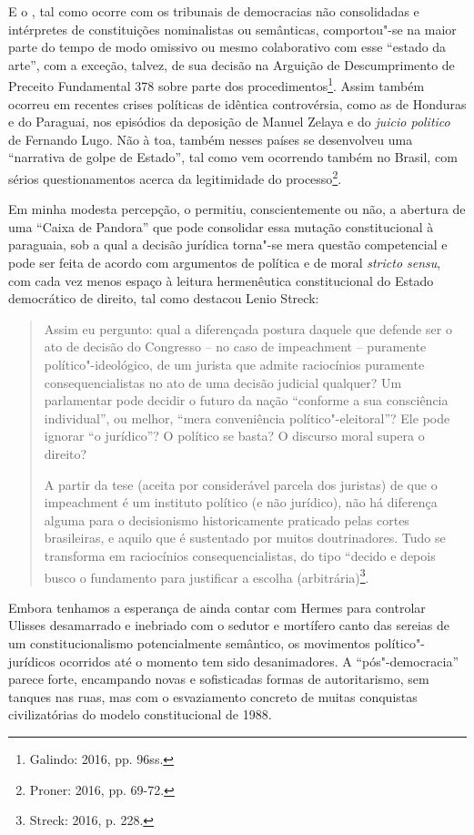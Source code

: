 E o , tal como ocorre com os tribunais de democracias não
consolidadas e intérpretes de constituições nominalistas ou semânticas,
comportou"-se na maior parte do tempo de modo omissivo ou mesmo
colaborativo com esse ``estado da arte'', com a exceção, talvez, de sua
decisão na Arguição de Descumprimento de Preceito Fundamental 378 sobre
parte dos procedimentos\footnote{Galindo: 2016, pp. 96ss.}. Assim também ocorreu
em recentes crises políticas de idêntica controvérsia, como as de
Honduras e do Paraguai, nos episódios da deposição de Manuel Zelaya e do
\emph{juicio politico} de Fernando Lugo. Não à toa, também nesses países
se desenvolveu uma ``narrativa de golpe de Estado'', tal como vem
ocorrendo também no Brasil, com sérios questionamentos acerca da
legitimidade do processo\footnote{Proner: 2016, pp. 69-72.}.

Em minha modesta percepção, o  permitiu, conscientemente ou não, a
abertura de uma ``Caixa de Pandora'' que pode consolidar essa mutação
constitucional à paraguaia, sob a qual a decisão jurídica torna"-se mera
questão competencial e pode ser feita de acordo com argumentos de
política e de moral \emph{stricto sensu}, com cada vez menos espaço à
leitura hermenêutica constitucional do Estado democrático de direito,
tal como destacou Lenio Streck:

\begin{quote}
Assim eu pergunto: qual a diferençada postura daquele que defende ser o
ato de decisão do Congresso -- no caso de impeachment --
puramente político"-ideológico, de um jurista que admite raciocínios
puramente consequencialistas no ato de uma decisão judicial qualquer? Um
parlamentar pode decidir o futuro da nação ``conforme a sua consciência
individual'', ou melhor, ``mera conveniência político"-eleitoral''? Ele
pode ignorar ``o jurídico''? O político se basta? O discurso moral
supera o direito?

A partir da tese (aceita por considerável parcela dos juristas) de que o
impeachment é um instituto político (e não jurídico), não há
diferença alguma para o decisionismo historicamente praticado pelas
cortes brasileiras, e aquilo que é sustentado por muitos doutrinadores.
Tudo se transforma em raciocínios consequencialistas, do tipo ``decido e
depois busco o fundamento para justificar a escolha (arbitrária)\footnote{Streck: 2016, p. 228.}.
\end{quote}

Embora tenhamos a esperança de ainda contar com Hermes para controlar
Ulisses desamarrado e inebriado com o sedutor e mortífero canto das
sereias de um constitucionalismo potencialmente semântico, os movimentos
político"-jurídicos ocorridos até o momento tem sido desanimadores. A
``pós"-democracia'' parece forte, encampando novas e sofisticadas formas
de autoritarismo, sem tanques nas ruas, mas com o esvaziamento concreto
de muitas conquistas civilizatórias do modelo constitucional de 1988.

